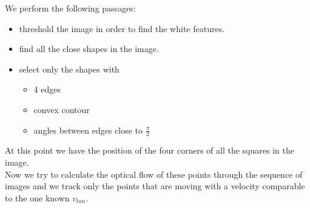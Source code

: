 We perform the following passages:
\begin{itemize}
\item threshold the image in order to find the white features.
\item find all the close shapes in the image.
\item select only the shapes with
\begin{itemize}
\item 4 edges
\item convex contour
\item angles between edges close to $\frac{\pi}{2}$
\end{itemize}
\end{itemize}
At this point we have the position of the four corners of all the squares in the image.\\
Now we try to calculate the optical flow of these points through the sequence of images and we track only the points that are moving with a velocity comparable to the one known $v_{tan}$.\\

